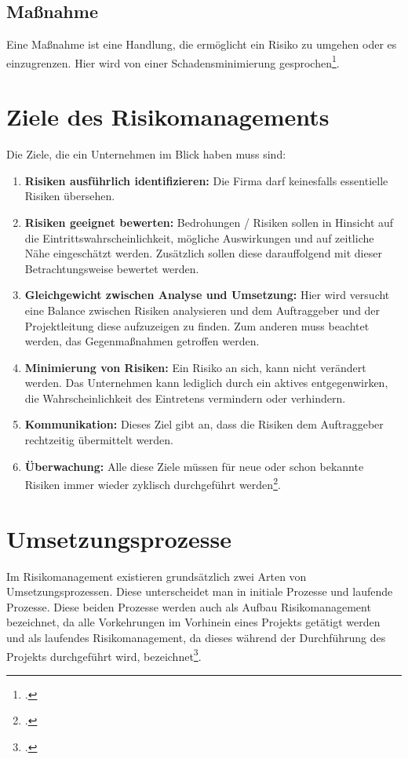 \subsection{Maßnahme}
Eine Maßnahme ist eine Handlung, die ermöglicht ein Risiko zu umgehen oder es einzugrenzen. Hier wird von einer Schadensminimierung gesprochen\footcite{risikomanagement-diplomarbeit}. 

\section{Ziele des Risikomanagements}
Die Ziele, die ein Unternehmen im Blick haben muss sind:
\begin{enumerate}
	\item \textbf{Risiken ausführlich identifizieren:} Die Firma darf keinesfalls essentielle Risiken übersehen.
	\item \textbf{Risiken geeignet bewerten:} Bedrohungen / Risiken sollen in Hinsicht auf die Eintrittswahrscheinlichkeit, mögliche Auswirkungen und auf zeitliche Nähe eingeschätzt werden. Zusätzlich sollen diese darauffolgend mit dieser Betrachtungsweise bewertet werden.
	\item \textbf{Gleichgewicht zwischen Analyse und Umsetzung:} Hier wird versucht eine Balance zwischen Risiken analysieren und dem Auftraggeber und der Projektleitung diese aufzuzeigen zu finden. Zum anderen muss beachtet werden, das Gegenmaßnahmen getroffen werden.
	\item \textbf{Minimierung von Risiken:} Ein Risiko an sich, kann nicht verändert werden. Das Unternehmen kann lediglich durch ein aktives entgegenwirken, die Wahrscheinlichkeit des Eintretens vermindern oder verhindern.
	\item \textbf{Kommunikation:} Dieses Ziel gibt an, dass die Risiken dem Auftraggeber rechtzeitig übermittelt werden.
	\item \textbf{Überwachung:} Alle diese Ziele müssen für neue oder schon bekannte Risiken immer wieder zyklisch durchgeführt werden\footcite{bva-risikomanagement}. 
\end{enumerate}

\section{Umsetzungsprozesse}
Im Risikomanagement existieren grundsätzlich zwei Arten von Umsetzungsprozessen. Diese unterscheidet man in initiale Prozesse und laufende Prozesse.
Diese beiden Prozesse werden auch als Aufbau Risikomanagement bezeichnet, da alle Vorkehrungen im Vorhinein eines Projekts getätigt werden und als laufendes Risikomanagement, da dieses während der Durchführung des Projekts durchgeführt wird, bezeichnet\footcite{bva-risikomanagement}.

